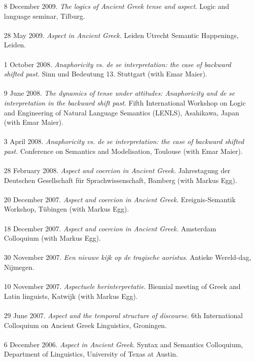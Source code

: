 \documentclass[a4paper,11pt]{article}
\begin{document}
8 December 2009. \emph{The logics of Ancient Greek tense and aspect}. Logic and language seminar, Tilburg.\\\\
28 May 2009. \emph{Aspect in Ancient Greek.} Leiden Utrecht Semantic Happenings, Leiden.\\\\
1 October 2008. \emph{Anaphoricity vs. de se interpretation: the case of backward shifted past.} Sinn und Bedeutung 13. Stuttgart (with Emar Maier).\\\\ 
9 June 2008. \emph{The dynamics of tense under attitudes: Anaphoricity and de se interpretation in the backward shift past.} Fifth International Workshop on Logic and Engineering of Natural Language Semantics (LENLS), Asahikawa, Japan (with Emar Maier).\\\\
3 April 2008. \emph{Anaphoricity vs. de se interpretation: the case of backward shifted past.} Conference on Semantics and Modelisation, Toulouse (with Emar Maier).\\\\
28 February 2008. \emph{Aspect and coercion in Ancient Greek.} Jahrestagung der Deutschen Gesellschaft f\"ur Sprachwissenschaft, Bamberg (with Markus Egg).\\\\
20 December 2007. \emph{Aspect and coercion in Ancient Greek.} Ereignis-Semantik Workshop, T\"ubingen (with Markus Egg).\\\\
18 December 2007. \emph{Aspect and coercion in Ancient Greek.} Amsterdam Colloquium (with Markus Egg).\\\\ 
30 November 2007. \emph{Een nieuwe kijk op de tragische aoristus}. Antieke Wereld-dag, Nijmegen.\\\\
10 November 2007. \emph{Aspectuele herinterpretatie}. Biennial meeting of Greek and Latin linguists, Katwijk (with Markus Egg).\\\\
29 June 2007. \emph{Aspect and the temporal structure of discourse}. 6th International Colloquium on Ancient Greek Linguistics, Groningen.\\\\
6 December 2006. \emph{Aspect in Ancient Greek}. Syntax and Semantics Colloquium, Department of Linguistics, University of Texas at Austin.\\\\
\end{document}
